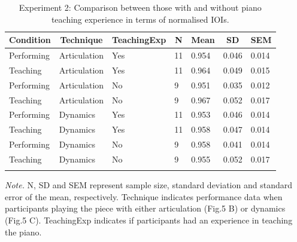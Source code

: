 \documentclass[
  man,floatsintext]{apa6}
\begin{document}
\begin{table}[tbp]

\begin{center}
\begin{threeparttable}

\caption{\label{tab:ioi-teaching-desc-2}Experiment 2: Comparison between those with and without piano teaching experience in terms of normalised IOIs.}

\begin{tabular}{lllllll}
\toprule
Condition & \multicolumn{1}{c}{Technique} & \multicolumn{1}{c}{TeachingExp} & \multicolumn{1}{c}{N} & \multicolumn{1}{c}{Mean} & \multicolumn{1}{c}{SD} & \multicolumn{1}{c}{SEM}\\
\midrule
Performing & Articulation & Yes & 11 & 0.954 & 0.046 & 0.014\\
Teaching & Articulation & Yes & 11 & 0.964 & 0.049 & 0.015\\
Performing & Articulation & No & 9 & 0.951 & 0.035 & 0.012\\
Teaching & Articulation & No & 9 & 0.967 & 0.052 & 0.017\\
Performing & Dynamics & Yes & 11 & 0.953 & 0.046 & 0.014\\
Teaching & Dynamics & Yes & 11 & 0.958 & 0.047 & 0.014\\
Performing & Dynamics & No & 9 & 0.958 & 0.041 & 0.014\\
Teaching & Dynamics & No & 9 & 0.955 & 0.052 & 0.017\\
\bottomrule
\addlinespace
\end{tabular}

\begin{tablenotes}[para]
\normalsize{\textit{Note.} N, SD and SEM represent sample size, standard deviation and standard error of the mean, respectively. Technique indicates performance data when participants playing the piece with either articulation (Fig.5 B) or dynamics (Fig.5 C). TeachingExp indicates if participants had an experience in teaching the piano.}
\end{tablenotes}

\end{threeparttable}
\end{center}

\end{table}
\end{document}
